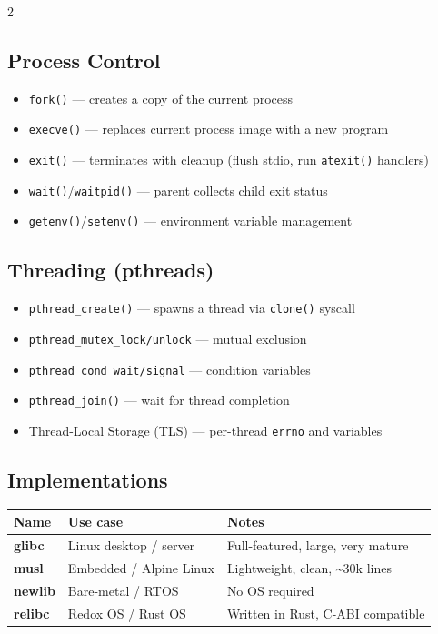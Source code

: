 2\documentclass[11pt,a4paper]{article}
\begin{document}
\subsection{Process Control}
\begin{itemize}[noitemsep]
  \item \texttt{fork()} --- creates a copy of the current process
  \item \texttt{execve()} --- replaces current process image with a new program
  \item \texttt{exit()} --- terminates with cleanup (flush stdio, run \texttt{atexit()} handlers)
  \item \texttt{wait()}/\texttt{waitpid()} --- parent collects child exit status
  \item \texttt{getenv()}/\texttt{setenv()} --- environment variable management
\end{itemize}

\subsection{Threading (pthreads)}
\begin{itemize}[noitemsep]
  \item \texttt{pthread\_create()} --- spawns a thread via \texttt{clone()} syscall
  \item \texttt{pthread\_mutex\_lock/unlock} --- mutual exclusion
  \item \texttt{pthread\_cond\_wait/signal} --- condition variables
  \item \texttt{pthread\_join()} --- wait for thread completion
  \item Thread-Local Storage (TLS) --- per-thread \texttt{errno} and variables
\end{itemize}

\subsection{Implementations}

\begin{center}
\begin{tabular}{>{\bfseries}p{2.5cm} p{4cm} p{5cm}}
\toprule
\rowcolor{tablehead} Name & Use case & Notes \\
\midrule
glibc   & Linux desktop / server & Full-featured, large, very mature \\
musl    & Embedded / Alpine Linux & Lightweight, clean, \textasciitilde{}30k lines \\
newlib  & Bare-metal / RTOS       & No OS required \\
relibc  & Redox OS / Rust OS      & Written in Rust, C-ABI compatible \\
\bottomrule
\end{tabular}
\end{center}
\end{document}
